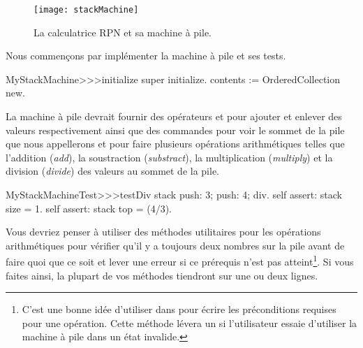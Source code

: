 \documentclass[a4paper,10pt,twoside]{book}
\begin{document}
\begin{figure}[ht]
\begin{center}
\texttt{[image: stackMachine]}
\caption{La calculatrice RPN et sa machine à pile.}
\end{center}
\end{figure}

Nous commençons par implémenter la machine à pile et ses tests.


\begin{code}{}
MyStackMachine>>>initialize
	super initialize.
	contents := OrderedCollection new.
\end{code}

La machine à pile devrait fournir des opérateurs  et
pour ajouter et enlever des valeurs respectivement ainsi que des
commandes pour voir le sommet de la pile que nous appellerons  
et pour faire plusieurs opérations arithmétiques telles que l'addition (\emph{add}),
la soustraction (\emph{substract}), la multiplication (\emph{multiply}) 
et la division (\emph{divide}) des valeurs au sommet de la pile.


\begin{code}{}
MyStackMachineTest>>>testDiv
	stack
		push: 3;
		push: 4;
		div.
	self assert: stack size = 1.
	self assert: stack top = (4/3).
\end{code}

Vous devriez penser à utiliser des méthodes utilitaires pour les
opérations arithmétiques pour vérifier qu'il y a toujours deux nombres
sur la pile avant de faire quoi que ce soit et lever une erreur si
ce prérequis n'est pas atteint\footnote{C'est une bonne idée d'utiliser  
dans 
pour écrire les préconditions requises pour une opération. Cette méthode lévera un 
 si l'utilisateur essaie d'utiliser la machine à pile dans un état invalide.}.
Si vous faites ainsi, la plupart de vos méthodes tiendront sur une ou deux lignes.
\end{document}
